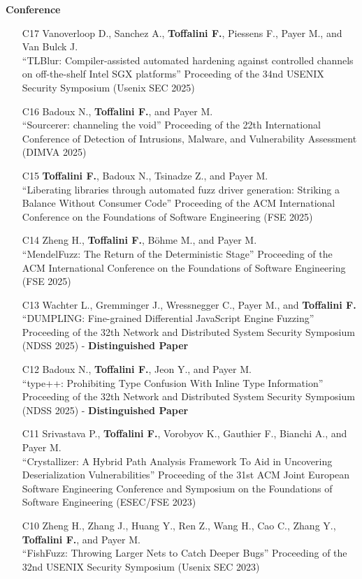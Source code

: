 \textbf{Conference}\begin{enumerate}[leftmargin=5mm]
\item[C17] Vanoverloop D., Sanchez A., \textbf{Toffalini F.}, Piessens F., Payer M., and Van Bulck J.\\``TLBlur: Compiler-assisted automated hardening against controlled channels on off-the-shelf Intel SGX platforms'' Proceeding of the 34nd USENIX Security Symposium (Usenix SEC 2025) 
\item[C16] Badoux N., \textbf{Toffalini F.}, and Payer M.\\``Sourcerer: channeling the void'' Proceeding of the 22th International Conference of Detection of Intrusions, Malware, and Vulnerability Assessment (DIMVA 2025) 
\item[C15] \textbf{Toffalini F.}, Badoux N., Tsinadze Z., and Payer M.\\``Liberating libraries through automated fuzz driver generation: Striking a Balance Without Consumer Code'' Proceeding of the ACM International Conference on the Foundations of Software Engineering (FSE 2025) 
\item[C14] Zheng H., \textbf{Toffalini F.}, Böhme M., and Payer M.\\``MendelFuzz: The Return of the Deterministic Stage'' Proceeding of the ACM International Conference on the Foundations of Software Engineering (FSE 2025) 
\item[C13] Wachter L., Gremminger J., Wressnegger C., Payer M., and \textbf{Toffalini F.}\\``DUMPLING: Fine-grained Differential JavaScript Engine Fuzzing'' Proceeding of the 32th Network and Distributed System Security Symposium (NDSS 2025)  - \textbf{Distinguished Paper}
\item[C12] Badoux N., \textbf{Toffalini F.}, Jeon Y., and Payer M.\\``type++: Prohibiting Type Confusion With Inline Type Information'' Proceeding of the 32th Network and Distributed System Security Symposium (NDSS 2025)  - \textbf{Distinguished Paper}
\item[C11] Srivastava P., \textbf{Toffalini F.}, Vorobyov K., Gauthier F., Bianchi A., and Payer M.\\``Crystallizer: A Hybrid Path Analysis Framework To Aid in Uncovering Deserialization Vulnerabilities'' Proceeding of the 31st ACM Joint European Software Engineering Conference and Symposium on the Foundations of Software Engineering (ESEC/FSE 2023) 
\item[C10] Zheng H., Zhang J., Huang Y., Ren Z., Wang H., Cao C., Zhang Y., \textbf{Toffalini F.}, and Payer M.\\``FishFuzz: Throwing Larger Nets to Catch Deeper Bugs'' Proceeding of the 32nd USENIX Security Symposium (Usenix SEC 2023) 

\end{enumerate}
